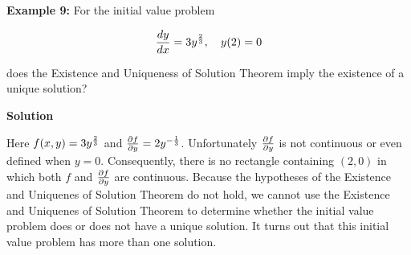 \nopagenumbers
{\bf Example 9:} For the initial value problem

$${dy\over dx}=3y^{2\over 3},\quad y(2)=0$$

does the Existence and Uniqueness of Solution Theorem imply the existence of a unique solution?


\vskip 10pt
{\bf Solution}

\vskip 6pt
Here $f(x,y)=3y^{2\over 3}$ and ${\partial f\over \partial y}=2y^{-{1\over 3}}$. Unfortunately ${\partial f\over \partial y}$ is not continuous or even defined when $y=0$. Consequently, there is no rectangle containing $(2,0)$ in which  both $f$ and ${\partial f\over \partial y}$ are continuous. Because the hypotheses of the Existence and Uniquenes of Solution Theorem do not hold, we cannot use the Existence and Uniquenes of Solution Theorem to determine whether the initial value problem does or does not have a unique solution. It turns out that this initial value problem has more than one solution.

\vfill\eject
\bye
